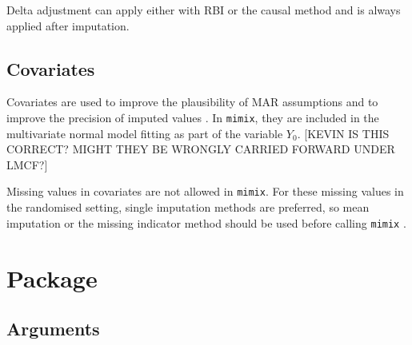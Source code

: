 
Delta adjustment can apply either with RBI or the causal method and is always applied after imputation.

\subsection{Covariates}

Covariates are used to improve the plausibility of MAR assumptions and to improve the precision of imputed values \citep{ian:MItutorial}. 
In \texttt{mimix}, they are included in the multivariate normal model fitting as part of the variable $Y_0$. 
[KEVIN IS THIS CORRECT? MIGHT THEY BE WRONGLY CARRIED FORWARD UNDER LMCF?]

Missing values in covariates are not allowed in \texttt{mimix}. For these missing values in the randomised setting, single imputation methods are preferred, so mean imputation or the missing indicator method should be used before calling \texttt{mimix} \citep{ian:MIinRCTs}.


\section{Package}

\subsection{Arguments} 

